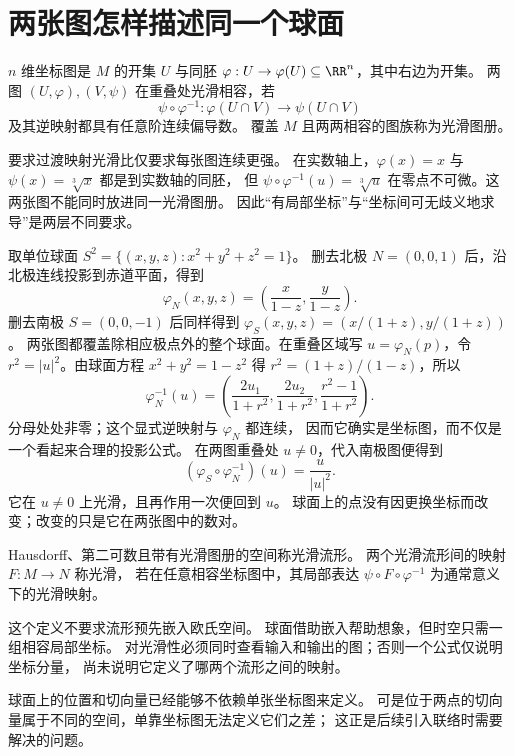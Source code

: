 \section{两张图怎样描述同一个球面}

\begin{definition}[坐标图与光滑相容]
\(n\) 维坐标图是 \(M\) 的开集 \(U\) 与同胚
\(\varphi:U\to\varphi(U)\subseteq\RR^n\)，其中右边为开集。
两图 \((U,\varphi),(V,\psi)\) 在重叠处光滑相容，若
\[
\psi\circ\varphi^{-1}:
\varphi(U\cap V)\longrightarrow\psi(U\cap V)
\]
及其逆映射都具有任意阶连续偏导数。
覆盖 \(M\) 且两两相容的图族称为光滑图册。
\end{definition}

要求过渡映射光滑比仅要求每张图连续更强。
在实数轴上，\(\varphi(x)=x\) 与
\(\psi(x)=\sqrt[3]{x}\) 都是到实数轴的同胚，
但 \(\psi\circ\varphi^{-1}(u)=\sqrt[3]{u}\)
在零点不可微。这两张图不能同时放进同一光滑图册。
因此“有局部坐标”与“坐标间可无歧义地求导”是两层不同要求。

取单位球面 \(S^2=\{(x,y,z):x^2+y^2+z^2=1\}\)。
删去北极 \(N=(0,0,1)\) 后，沿北极连线投影到赤道平面，得到
\[
\varphi_N(x,y,z)=\left(\frac{x}{1-z},\frac{y}{1-z}\right).
\]
删去南极 \(S=(0,0,-1)\) 后同样得到
\(\varphi_S(x,y,z)=(x/(1+z),y/(1+z))\)。
两张图都覆盖除相应极点外的整个球面。在重叠区域写
\(u=\varphi_N(p)\)，令 \(r^2=|u|^2\)。由球面方程
\(x^2+y^2=1-z^2\) 得
\(r^2=(1+z)/(1-z)\)，所以
\[
\varphi_N^{-1}(u)=
\left(\frac{2u_1}{1+r^2},
\frac{2u_2}{1+r^2},
\frac{r^2-1}{1+r^2}\right).
\]
分母处处非零；这个显式逆映射与 \(\varphi_N\) 都连续，
因而它确实是坐标图，而不仅是一个看起来合理的投影公式。
在两图重叠处 \(u\ne0\)，代入南极图便得到
\[
(\varphi_S\circ\varphi_N^{-1})(u)=\frac{u}{|u|^2}.
\]
它在 \(u\ne0\) 上光滑，且再作用一次便回到 \(u\)。
球面上的点没有因更换坐标而改变；改变的只是它在两张图中的数对。

\begin{definition}[光滑流形与光滑映射]
Hausdorff、第二可数且带有光滑图册的空间称光滑流形。
两个光滑流形间的映射 \(F:M\to N\) 称光滑，
若在任意相容坐标图中，其局部表达
\(\psi\circ F\circ\varphi^{-1}\) 为通常意义下的光滑映射。
\end{definition}

这个定义不要求流形预先嵌入欧氏空间。
球面借助嵌入帮助想象，但时空只需一组相容局部坐标。
对光滑性必须同时查看输入和输出的图；否则一个公式仅说明坐标分量，
尚未说明它定义了哪两个流形之间的映射。

球面上的位置和切向量已经能够不依赖单张坐标图来定义。
可是位于两点的切向量属于不同的空间，单靠坐标图无法定义它们之差；
这正是后续引入联络时需要解决的问题。
